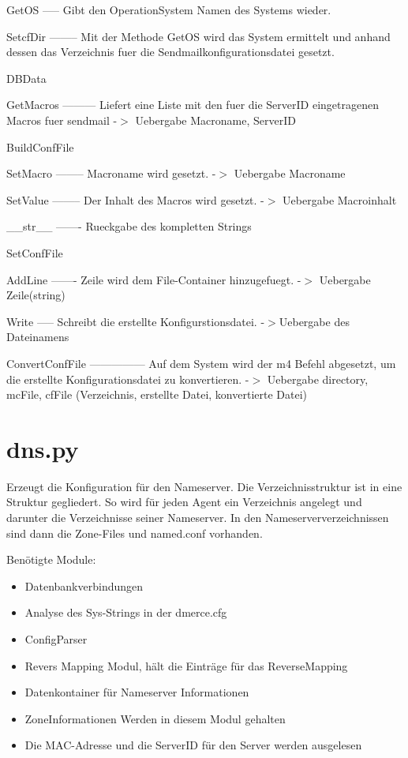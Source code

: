         GetOS
        -----
        Gibt den OperationSystem Namen des Systems wieder.

        SetcfDir
        --------
        Mit der Methode GetOS wird das System ermittelt und anhand
        dessen das Verzeichnis fuer die Sendmailkonfigurationsdatei
        gesetzt.
        
DBData

        GetMacros
        ---------
        Liefert eine Liste mit den fuer die ServerID eingetragenen
        Macros fuer sendmail
        -$>$ Uebergabe Macroname, ServerID

BuildConfFile

        SetMacro
        --------
        Macroname wird gesetzt.
        -$>$ Uebergabe Macroname

        SetValue
        --------
        Der Inhalt des Macros wird gesetzt.
        -$>$ Uebergabe Macroinhalt

        \_\_str\_\_
        -------
        Rueckgabe des kompletten Strings

SetConfFile

        AddLine
        -------
        Zeile wird dem File-Container hinzugefuegt.
        -$>$ Uebergabe Zeile(string)

        Write
        -----
        Schreibt die erstellte Konfigurstionsdatei.
        -$>$Uebergabe des Dateinamens   

        ConvertConfFile
        ---------------
        Auf dem System wird der m4 Befehl abgesetzt, um die
        erstellte Konfigurationsdatei zu konvertieren.
        -$>$ Uebergabe directory, mcFile, cfFile (Verzeichnis, erstellte Datei,
           konvertierte Datei)

\section{dns.py}

Erzeugt die Konfiguration f\"ur den Nameserver. Die
Verzeichnisstruktur ist in eine Struktur gegliedert. So wird f\"ur
jeden Agent ein Verzeichnis angelegt und darunter die Verzeichnisse
seiner Nameserver. In den Nameserververzeichnissen sind dann die
Zone-Files und named.conf vorhanden.

Ben\"otigte Module:

\begin{itemize}
\item{} Datenbankverbindungen
\item{} Analyse des Sys-Strings in der dmerce.cfg
\item{} ConfigParser
\item{} Revers Mapping Modul, h\"alt die Eintr\"age f\"ur das ReverseMapping
\item{} Datenkontainer f\"ur Nameserver Informationen
\item{} ZoneInformationen Werden in diesem Modul gehalten
\item{} Die MAC-Adresse und die ServerID f\"ur den Server werden ausgelesen
\end{itemize}


